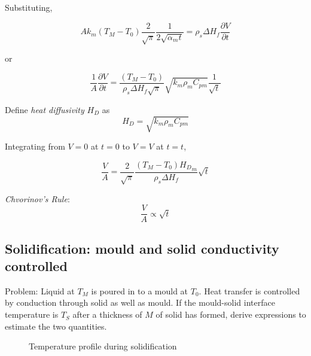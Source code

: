 Substituting,

$$
A k_m (T_M - T_0) \frac{2}{\sqrt{\pi}} \frac{1}{2 \sqrt{\alpha_m t}} = \rho_s
\Delta H_f \frac{\partial V}{\partial t} 
$$

or

$$
\frac{1}{A} \frac{\partial V}{\partial t} =  \frac{(T_M - T_0)}{\rho_s \Delta
H_f \sqrt{\pi}} \sqrt{k_m \rho_m C_{pm}} \frac{1}{\sqrt{t}} 
$$

Define {\em heat diffusivity} $H_D$ as 
$$
\boxed{
H_D = \sqrt{k_m \rho_m C_{pm}}
}
$$

Integrating from $V=0$ at $t=0$ to $V=V$ at $t=t$,

$$
\boxed{
\frac{V}{A} =  \frac{2}{\sqrt{\pi}} \frac{(T_M - T_0) {H_D}_m}{\rho_s \Delta
H_f}  \sqrt{t} 
}
$$

{\em Chvorinov's Rule}:
$$
\frac{V}{A} \propto \sqrt{t}
$$

\subsection{Solidification: mould and solid conductivity controlled}

Problem: Liquid at $T_M$ is poured in to a mould at $T_0$. Heat transfer is
controlled by conduction through solid as well as mould. If the mould-solid
interface temperature is $T_S$ after a thickness of $M$ of solid has formed,
derive expressions to estimate the two quantities.

\begin{figure}[h]
\begin{center}
\end{center}
\caption{Temperature profile during solidification}
\label{ratesol2}
\end{figure}

